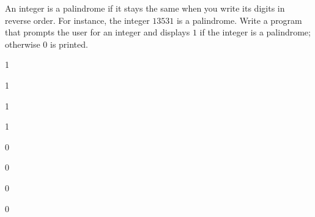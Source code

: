 An integer is a palindrome if it stays the same when you write its digits in
reverse order. For instance, the integer $13531$ is a palindrome. Write a
program that prompts the user for an integer and displays $1$ if the integer is
a palindrome; otherwise $0$ is printed.

\resett
\nextt
\begin{console}[frame=single, commandchars=\\\{\}]
1
\end{console}

\nextt
\begin{console}[frame=single, commandchars=\\\{\}]
1
\end{console}

\nextt
\begin{console}[frame=single, commandchars=\\\{\}]
1
\end{console}

\nextt
\begin{console}[frame=single, commandchars=\\\{\}]
1
\end{console}

\nextt
\begin{console}[frame=single, commandchars=\\\{\}]
0
\end{console}

\nextt
\begin{console}[frame=single, commandchars=\\\{\}]
0
\end{console}

\nextt
\begin{console}[frame=single, commandchars=\\\{\}]
0
\end{console}

\nextt
\begin{console}[frame=single, commandchars=\\\{\}]
0
\end{console}

